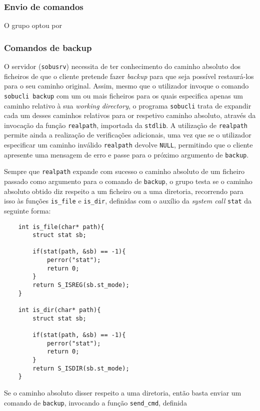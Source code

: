 \documentclass[a4paper,12pt,titlepage,portuguese]{article}
\begin{document}
\begin{itemize}
\subsubsection{Envio de comandos} \label{Envio de comandos}

O grupo optou por 


\subsubsection{Comandos de backup}

O servidor (\texttt{sobusrv}) necessita de ter conhecimento do caminho absoluto dos ficheiros de que o cliente pretende fazer \emph{backup} para que seja possível restaurá-los para o seu caminho original. Assim, mesmo que o utilizador invoque o comando \texttt{sobucli backup} com um ou mais ficheiros para os quais especifica apenas um caminho relativo à sua \emph{working directory}, o programa \texttt{sobucli} trata de expandir cada um desses caminhos relativos para or respetivo caminho absoluto, através da invocação da função \texttt{realpath}, importada da \texttt{stdlib}. A utilização de \texttt{realpath} permite ainda a realização de verificações adicionais, uma vez que se o utilizador especificar um caminho inválido \texttt{realpath} devolve \texttt{NULL}, permitindo que o cliente apresente uma mensagem de erro e passe para o próximo argumento de \texttt{backup}.

Sempre que \texttt{realpath} expande com sucesso o caminho absoluto de um ficheiro passado como argumento para o comando de \texttt{backup}, o grupo testa se o caminho absoluto obtido diz respeito a um ficheiro ou a uma diretoria, recorrendo para isso às funções \texttt{is_file} e \texttt{is_dir}, definidas com o auxílio da \emph{system call} \texttt{stat} da seguinte forma:

	\begin{verbatim}
	int is_file(char* path){
		struct stat sb;

		if(stat(path, &sb) == -1){
			perror("stat");
			return 0;
		}
		return S_ISREG(sb.st_mode);
	}

	int is_dir(char* path){
		struct stat sb;

		if(stat(path, &sb) == -1){
			perror("stat");
			return 0;
		}
		return S_ISDIR(sb.st_mode);
	}
	\end{verbatim}

Se o caminho absoluto disser respeito a uma diretoria, então basta enviar um comando de \texttt{backup}, invocando a função \texttt{send_cmd}, definida



\end{itemize}
\end{document}
